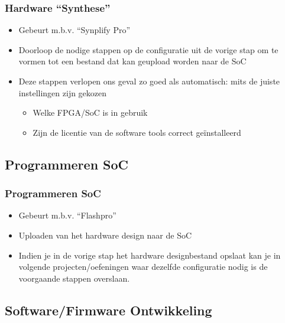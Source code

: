 \documentclass{beamer}
\begin{document}
\begin{frame} 
\frametitle{Hardware ``Synthese''}
  \begin{itemize}[<+->]
    \item Gebeurt m.b.v. ``Synplify Pro''
    \item Doorloop de nodige stappen op de configuratie uit de vorige stap om te vormen tot een bestand dat kan geupload worden naar de SoC
    \item Deze stappen verlopen ons geval zo goed als automatisch: mits de juiste instellingen zijn gekozen
      \begin{itemize}
      \item Welke FPGA/SoC is in gebruik
      \item Zijn de licentie van de software tools correct ge\"installeerd
      \end{itemize}
  \end{itemize}
\end{frame}

\subsection{Programmeren SoC}

\begin{frame} 
\frametitle{Programmeren SoC}
  \begin{itemize}[<+->]
    \item Gebeurt m.b.v. ``Flashpro''
    \item Uploaden van het hardware design naar de SoC
    \item Indien je in de vorige stap het hardware designbestand opslaat kan je in volgende projecten/oefeningen waar dezelfde configuratie nodig is de voorgaande stappen overslaan.
  \end{itemize}
\end{frame}

\subsection{Software/Firmware Ontwikkeling}
\end{document}
